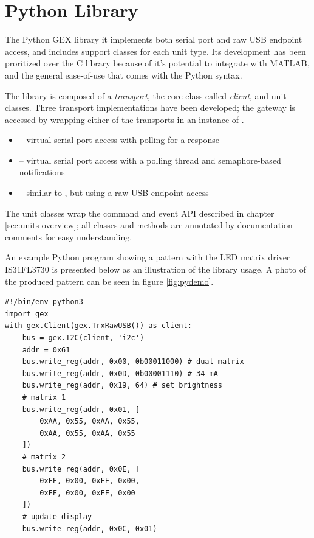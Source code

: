 \section{Python Library}

The Python GEX library it implements both serial port and raw USB endpoint access, and includes support classes for each unit type. Its development has been proritized over the C library because of it's potential to integrate with MATLAB, and the general ease-of-use that comes with the Python syntax.

The library is composed of a \textit{transport}, the core class called \textit{client}, and unit classes. Three transport implementations have been developed; the gateway is accessed by wrapping either of the transports in an instance of .

\begin{itemize}
	\item {} -- virtual serial port access with polling for a response
	
	\item {} -- virtual serial port access with a polling thread and semaphore-based notifications
	
	\item {} -- similar to , but using a raw USB endpoint access
\end{itemize}

The unit classes wrap the command and event \gls{API} described in chapter \ref{sec:units-overview}; all classes and methods are annotated by documentation comments for easy understanding.

An example Python program showing a pattern with the \gls{LED} matrix driver IS31FL3730 is presented below as an illustration of the library usage. A photo of the produced pattern can be seen in figure \ref{fig:pydemo}.

\begin{verbatim}
#!/bin/env python3
import gex  
with gex.Client(gex.TrxRawUSB()) as client:
    bus = gex.I2C(client, 'i2c')
    addr = 0x61
    bus.write_reg(addr, 0x00, 0b00011000) # dual matrix
    bus.write_reg(addr, 0x0D, 0b00001110) # 34 mA
    bus.write_reg(addr, 0x19, 64) # set brightness
    # matrix 1
    bus.write_reg(addr, 0x01, [
        0xAA, 0x55, 0xAA, 0x55,
        0xAA, 0x55, 0xAA, 0x55
    ])
    # matrix 2
    bus.write_reg(addr, 0x0E, [
        0xFF, 0x00, 0xFF, 0x00,
        0xFF, 0x00, 0xFF, 0x00
    ])
    # update display
    bus.write_reg(addr, 0x0C, 0x01)
\end{verbatim}

